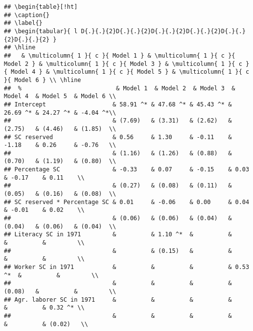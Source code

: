 \documentclass[
]{article}
\begin{document}
\begin{verbatim}
## \begin{table}[!ht]
## \caption{}
## \label{} 
## \begin{tabular}{ l D{.}{.}{2}D{.}{.}{2}D{.}{.}{2}D{.}{.}{2}D{.}{.}{2}D{.}{.}{2} } 
## \hline 
##   & \multicolumn{ 1 }{ c }{ Model 1 } & \multicolumn{ 1 }{ c }{ Model 2 } & \multicolumn{ 1 }{ c }{ Model 3 } & \multicolumn{ 1 }{ c }{ Model 4 } & \multicolumn{ 1 }{ c }{ Model 5 } & \multicolumn{ 1 }{ c }{ Model 6 } \\ \hline
##  %                           & Model 1  & Model 2  & Model 3  & Model 4  & Model 5  & Model 6 \\ 
## Intercept                   & 58.91 ^* & 47.68 ^* & 45.43 ^* & 26.69 ^* & 24.27 ^* & -4.04 ^*\\ 
##                             & (7.69)   & (3.31)   & (2.62)   & (2.75)   & (4.46)   & (1.85)  \\ 
## SC reserved                 & 0.56     & 1.30     & -0.11    & -1.18    & 0.26     & -0.76   \\ 
##                             & (1.16)   & (1.26)   & (0.88)   & (0.70)   & (1.19)   & (0.80)  \\ 
## Percentage SC               & -0.33    & 0.07     & -0.15    & 0.03     & -0.17    & 0.11    \\ 
##                             & (0.27)   & (0.08)   & (0.11)   & (0.05)   & (0.16)   & (0.08)  \\ 
## SC reserved * Percentage SC & 0.01     & -0.06    & 0.00     & 0.04     & -0.01    & 0.02    \\ 
##                             & (0.06)   & (0.06)   & (0.04)   & (0.04)   & (0.06)   & (0.04)  \\ 
## Literacy SC in 1971         &          & 1.10 ^*  &          &          &          &         \\ 
##                             &          & (0.15)   &          &          &          &         \\ 
## Worker SC in 1971           &          &          &          & 0.53 ^*  &          &         \\ 
##                             &          &          &          & (0.08)   &          &         \\ 
## Agr. laborer SC in 1971     &          &          &          &          &          & 0.32 ^* \\ 
##                             &          &          &          &          &          & (0.02)   \\

\end{verbatim}
\end{document}
